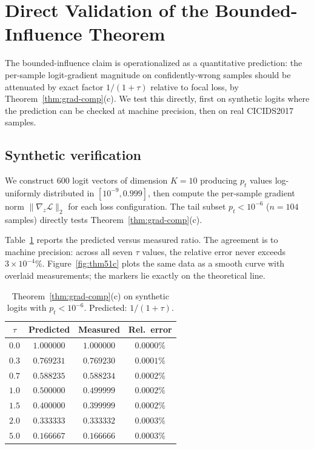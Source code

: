 \documentclass[conference]{IEEEtran}
\theoremstyle{definition}
\begin{document}
\section{Direct Validation of the Bounded-Influence Theorem}
\label{sec:exp-grad}

The bounded-influence claim is operationalized as a quantitative prediction: the per-sample logit-gradient magnitude on confidently-wrong samples should be attenuated by exact factor $1/(1+\tau)$ relative to focal loss, by Theorem~\ref{thm:grad-comp}(c). We test this directly, first on synthetic logits where the prediction can be checked at machine precision, then on real CICIDS2017 samples.

\subsection{Synthetic verification}
\label{sec:exp-synth}

We construct $600$ logit vectors of dimension $K = 10$ producing $p_t$ values log-uniformly distributed in $[10^{-9}, 0.999]$, then compute the per-sample gradient norm $\|\nabla_z \mathcal{L}\|_2$ for each loss configuration. The tail subset $p_t < 10^{-6}$ ($n = 104$ samples) directly tests Theorem~\ref{thm:grad-comp}(c).

Table~\ref{tab:thm51c-synthetic} reports the predicted versus measured ratio. The agreement is to machine precision: across all seven $\tau$ values, the relative error never exceeds $3 \times 10^{-4}\%$. Figure~\ref{fig:thm51c} plots the same data as a smooth curve with overlaid measurements; the markers lie exactly on the theoretical line.

\begin{table}[t]
\caption{Theorem~\ref{thm:grad-comp}(c) on synthetic logits with $p_t < 10^{-6}$. Predicted: $1/(1+\tau)$.}
\label{tab:thm51c-synthetic}
\centering
\begin{tabular}{cccc}
\toprule
$\tau$ & Predicted & Measured & Rel.\ error \\
\midrule
$0.0$ & $1.000000$ & $1.000000$ & $0.0000\%$ \\
$0.3$ & $0.769231$ & $0.769230$ & $0.0001\%$ \\
$0.7$ & $0.588235$ & $0.588234$ & $0.0002\%$ \\
$1.0$ & $0.500000$ & $0.499999$ & $0.0002\%$ \\
$1.5$ & $0.400000$ & $0.399999$ & $0.0002\%$ \\
$2.0$ & $0.333333$ & $0.333332$ & $0.0003\%$ \\
$5.0$ & $0.166667$ & $0.166666$ & $0.0003\%$ \\
\bottomrule
\end{tabular}
\end{table}
\end{document}
